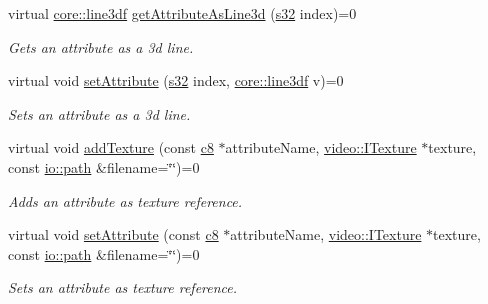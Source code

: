 \begin{DoxyCompactItemize}
virtual \hyperlink{namespaceirr_1_1core_a384a3bb17659466af5521c7f74cfcea7}{core\+::line3df} \hyperlink{classirr_1_1io_1_1IAttributes_ab6cc3141c7d5bd82ade97c7da899d025}{get\+Attribute\+As\+Line3d} (\hyperlink{namespaceirr_ac66849b7a6ed16e30ebede579f9b47c6}{s32} index)=0
\begin{DoxyCompactList}\small\item\em Gets an attribute as a 3d line. \end{DoxyCompactList}\item 
\mbox{\label{classirr_1_1io_1_1IAttributes_ad39ffaf8f149906be60f9ef71dff9110}} 
virtual void \hyperlink{classirr_1_1io_1_1IAttributes_ad39ffaf8f149906be60f9ef71dff9110}{set\+Attribute} (\hyperlink{namespaceirr_ac66849b7a6ed16e30ebede579f9b47c6}{s32} index, \hyperlink{namespaceirr_1_1core_a384a3bb17659466af5521c7f74cfcea7}{core\+::line3df} v)=0
\begin{DoxyCompactList}\small\item\em Sets an attribute as a 3d line. \end{DoxyCompactList}\item 
\mbox{\label{classirr_1_1io_1_1IAttributes_a3e2ee4641f97a67bd9be924d1e2b8f2c}} 
virtual void \hyperlink{classirr_1_1io_1_1IAttributes_a3e2ee4641f97a67bd9be924d1e2b8f2c}{add\+Texture} (const \hyperlink{namespaceirr_a9395eaea339bcb546b319e9c96bf7410}{c8} $\ast$attribute\+Name, \hyperlink{classirr_1_1video_1_1ITexture}{video\+::\+I\+Texture} $\ast$texture, const \hyperlink{namespaceirr_1_1io_ab1bdc45edb3f94d8319c02bc0f840ee1}{io\+::path} \&filename=\char`\"{}\char`\"{})=0
\begin{DoxyCompactList}\small\item\em Adds an attribute as texture reference. \end{DoxyCompactList}\item 
\mbox{\label{classirr_1_1io_1_1IAttributes_a8d7bd343b16d026b58ea2f5d175fd022}} 
virtual void \hyperlink{classirr_1_1io_1_1IAttributes_a8d7bd343b16d026b58ea2f5d175fd022}{set\+Attribute} (const \hyperlink{namespaceirr_a9395eaea339bcb546b319e9c96bf7410}{c8} $\ast$attribute\+Name, \hyperlink{classirr_1_1video_1_1ITexture}{video\+::\+I\+Texture} $\ast$texture, const \hyperlink{namespaceirr_1_1io_ab1bdc45edb3f94d8319c02bc0f840ee1}{io\+::path} \&filename=\char`\"{}\char`\"{})=0
\begin{DoxyCompactList}\small\item\em Sets an attribute as texture reference. \end{DoxyCompactList}\item 

\end{DoxyCompactItemize}
